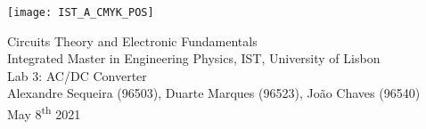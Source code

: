 \thispagestyle {empty}

\texttt{[image: IST\_A\_CMYK\_POS]}

\begin{center}

\vspace{1.0cm}

\vspace{1cm}
{\FontLb Circuits Theory and Electronic Fundamentals} \\ 
\vspace{0.5cm}
{\FontSn Integrated Master in Engineering Physics, IST, University of Lisbon} \\
\vspace{0.5cm}
{\FontSn Lab 3: AC/DC Converter} \\
\vspace{0.2cm}
{\FontSn Alexandre Sequeira (96503), Duarte Marques (96523), João Chaves (96540)} \\
\vspace{0.2cm}
{\FontSn May 8\textsuperscript{th} 2021} \\ %
%
\end{center}

